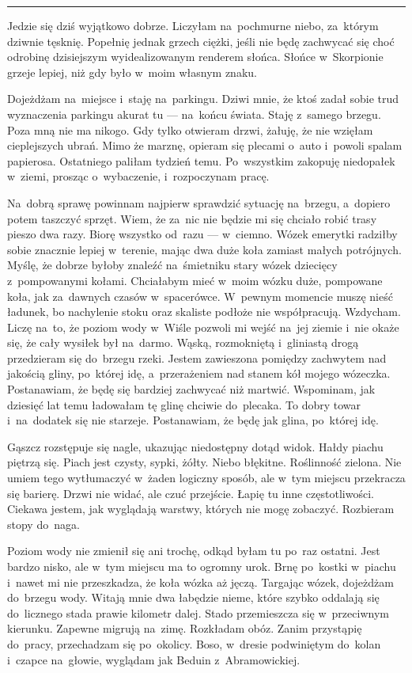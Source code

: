 \documentclass[9pt, a5paper]{memoir}
\begin{document}
\fancybreak{* \quad * \quad *}

Jedzie się dziś wyjątkowo dobrze. Liczyłam na~pochmurne niebo, za~którym dziwnie tęsknię. Popełnię jednak grzech ciężki, jeśli nie będę zachwycać się choć odrobinę dzisiejszym wyidealizowanym renderem słońca. Słońce w~Skorpionie grzeje lepiej, niż gdy było w~moim własnym znaku.

Dojeżdżam na~miejsce i~staję na~parkingu. Dziwi mnie, że ktoś zadał sobie trud wyznaczenia parkingu akurat tu --- na~końcu świata. Staję z~samego brzegu. Poza mną nie ma nikogo. Gdy tylko otwieram drzwi, żałuję, że nie wzięłam cieplejszych ubrań. Mimo że marznę, opieram się plecami o~auto i~powoli spalam papierosa. Ostatniego paliłam tydzień temu. Po~wszystkim zakopuję niedopałek w~ziemi, prosząc o~wybaczenie, i~rozpoczynam pracę.

Na~dobrą sprawę powinnam najpierw sprawdzić sytuację na~brzegu, a~dopiero potem taszczyć sprzęt. Wiem, że za~nic nie będzie mi się chciało robić trasy pieszo dwa razy. Biorę wszystko od~razu --- w~ciemno. Wózek emerytki radziłby sobie znacznie lepiej w~terenie, mając dwa duże koła zamiast małych potrójnych. Myślę, że dobrze byłoby znaleźć na~śmietniku stary wózek dziecięcy z~pompowanymi kołami. Chciałabym mieć w~moim wózku duże, pompowane koła, jak za~dawnych czasów w~spacerówce. W~pewnym momencie muszę nieść ładunek, bo nachylenie stoku oraz skaliste podłoże nie współpracują. Wzdycham. Liczę na~to, że poziom wody w~Wiśle pozwoli mi wejść na~jej ziemie i~nie okaże się, że cały wysiłek był na~darmo. Wąską, rozmokniętą i~gliniastą drogą przedzieram się do~brzegu rzeki. Jestem zawieszona pomiędzy zachwytem nad jakością gliny, po~której idę, a~przerażeniem nad stanem kół mojego wózeczka. Postanawiam, że będę się bardziej zachwycać niż martwić. Wspominam, jak dziesięć lat temu ładowałam tę glinę chciwie do~plecaka. To dobry towar i~na~dodatek się nie starzeje. Postanawiam, że będę jak glina, po~której idę.

Gąszcz rozstępuje się nagle, ukazując niedostępny dotąd widok. Hałdy piachu piętrzą się. Piach jest czysty, sypki, żółty. Niebo błękitne. Roślinność zielona. Nie umiem tego wytłumaczyć w~żaden logiczny sposób, ale w~tym miejscu przekracza się barierę. Drzwi nie widać, ale czuć przejście. Łapię tu inne częstotliwości. Ciekawa jestem, jak wyglądają warstwy, których nie mogę zobaczyć. Rozbieram stopy do~naga.

Poziom wody nie zmienił się ani trochę, odkąd byłam tu po~raz ostatni. Jest bardzo nisko, ale w~tym miejscu ma to ogromny urok. Brnę po~kostki w~piachu i~nawet mi nie przeszkadza, że koła wózka aż jęczą. Targając wózek, dojeżdżam do~brzegu wody. Witają mnie dwa łabędzie nieme, które szybko oddalają się do~licznego stada prawie kilometr dalej. Stado przemieszcza się w~przeciwnym kierunku. Zapewne migrują na~zimę. Rozkładam obóz. Zanim przystąpię do~pracy, przechadzam się po~okolicy. Boso, w~dresie podwiniętym do~kolan i~czapce na~głowie, wyglądam jak Beduin z~Abramowickiej.
\end{document}
